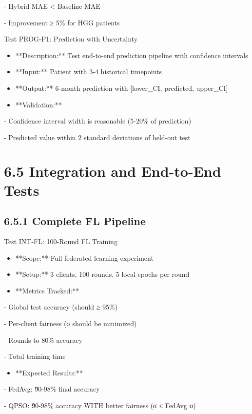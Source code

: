 - Hybrid MAE < Baseline MAE

- Improvement ≥ 5\% for HGG patients

Test PROG-P1: Prediction with Uncertainty

\begin{itemize}
  \item **Description:** Test end-to-end prediction pipeline with confidence intervals
  \item **Input:** Patient with 3-4 historical timepoints
  \item **Output:** 6-month prediction with [lower\_CI, predicted, upper\_CI]
  \item **Validation:**
\end{itemize}

- Confidence interval width is reasonable (5-20\% of prediction)

- Predicted value within 2 standard deviations of held-out test


\section{6.5 Integration and End-to-End Tests}

\subsection{6.5.1 Complete FL Pipeline}
Test INT-FL: 100-Round FL Training

\begin{itemize}
  \item **Scope:** Full federated learning experiment
  \item **Setup:** 3 clients, 100 rounds, 5 local epochs per round
  \item **Metrics Tracked:**
\end{itemize}

- Global test accuracy (should ≥ 95\%)

- Per-client fairness (σ should be minimized)

- Rounds to 80\% accuracy

- Total training time

\begin{itemize}
  \item **Expected Results:**
\end{itemize}

- FedAvg: \~90-98\% final accuracy

- QPSO: \~90-98\% accuracy WITH better fairness (σ ≤ FedAvg σ)


